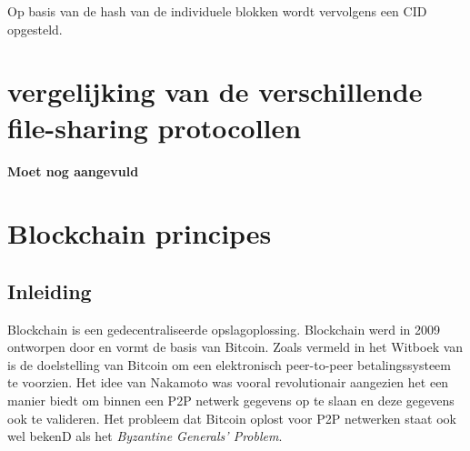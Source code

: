 Op basis van de hash van de individuele blokken wordt vervolgens een CID opgesteld.  

\section{vergelijking van de verschillende file-sharing protocollen}
\label{vergelijking-FS}
\textbf{Moet nog aangevuld}

\section{Blockchain principes}
\subsection{Inleiding}
Blockchain is een gedecentraliseerde opslagoplossing. Blockchain werd in 2009 ontworpen door \textcite{Satoshi2009} en vormt de basis van Bitcoin. Zoals vermeld in het Witboek van \textcite{Satoshi2009} is de doelstelling van Bitcoin om een elektronisch peer-to-peer betalingssysteem te voorzien. Het idee van Nakamoto was vooral revolutionair aangezien het een manier biedt om binnen een P2P netwerk gegevens op te slaan en deze gegevens ook te valideren. Het probleem dat Bitcoin oplost voor P2P netwerken staat ook wel bekenD als het \textit{Byzantine Generals’ Problem}.\\

